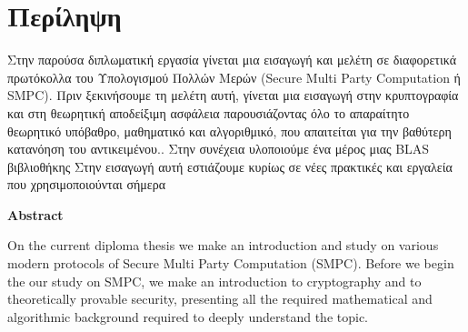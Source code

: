 \chapter*{Περίληψη}

\pagestyle{plain}

Στην παρούσα διπλωματική εργασία γίνεται μια εισαγωγή και μελέτη σε διαφορετικά πρωτόκολλα του Υπολογισμού Πολλών Μερών (Secure Multi Party Computation ή SMPC). Πριν ξεκινήσουμε τη μελέτη αυτή, γίνεται μια εισαγωγή στην κρυπτογραφία και στη θεωρητική αποδείξιμη ασφάλεια παρουσιάζοντας όλο το απαραίτητο θεωρητικό υπόβαθρο, μαθηματικό και αλγοριθμικό, που απαιτείται για την βαθύτερη κατανόηση του αντικειμένου.. Στην συνέχεια υλοποιούμε ένα μέρος μιας BLAS βιβλιοθήκης  Στην εισαγωγή αυτή εστιάζουμε κυρίως σε νέες πρακτικές και εργαλεία που χρησιμοποιούνται σήμερα

\vspace{0.3cm}

\begin{flushleft}
\huge\textbf{Abstract}
\end{flushleft}

On the current diploma thesis we make an introduction and study on various modern protocols of Secure Multi Party Computation (SMPC). Before we begin the our study on SMPC, we make an introduction to cryptography and to theoretically provable security, presenting all the required mathematical and algorithmic background required to deeply understand the topic.